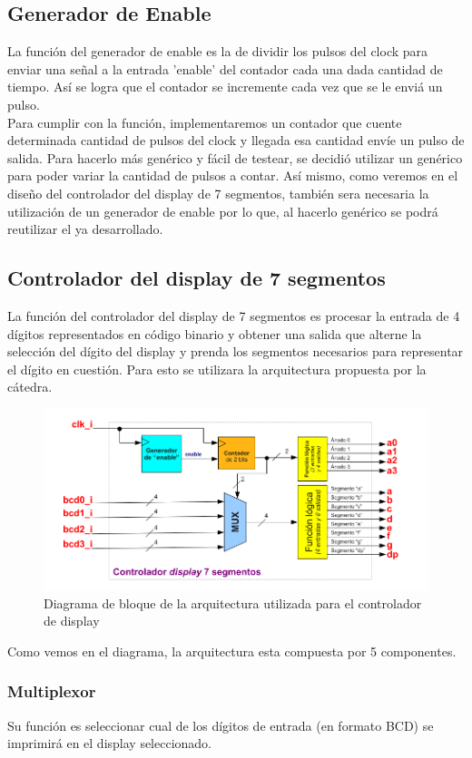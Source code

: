 \documentclass[a4paper,10pt]{article}
\begin{document}
	\subsection{Generador de Enable}
	La función del generador de enable es la de dividir los pulsos del clock para enviar una señal a la entrada 'enable' del contador cada una dada cantidad de tiempo. Así se logra que el contador se incremente cada vez que se le enviá un pulso. \\
	Para cumplir con la función, implementaremos un contador que cuente determinada cantidad de pulsos del clock y llegada esa cantidad envíe un pulso de salida. Para hacerlo más genérico y fácil de testear, se decidió utilizar un genérico para poder variar la cantidad de pulsos a contar. Así mismo, como veremos en el diseño del controlador del display de 7 segmentos, también sera necesaria la utilización de un generador de enable por lo que, al hacerlo genérico se podrá reutilizar el ya desarrollado.
	\subsection{Controlador del display de 7 segmentos}
	La función del controlador del display de 7 segmentos es procesar la entrada de 4 dígitos representados en código binario y obtener una salida que alterne la selección del dígito del display y prenda los segmentos necesarios para representar el dígito en cuestión. Para esto se utilizara la arquitectura propuesta por la cátedra.
		\begin{figure}[H]
			\centering
			\includegraphics[scale=0.5]{diagBloques_contr.png}
			\caption{Diagrama de bloque de la arquitectura utilizada para el controlador de display}
			\label{fig:diag_contr}
		\end{figure}
	Como vemos en el diagrama, la arquitectura esta compuesta por 5 componentes.
		\subsubsection{Multiplexor}
		Su función es seleccionar cual de los dígitos de entrada (en formato BCD) se imprimirá en el display seleccionado. 
\end{document}
